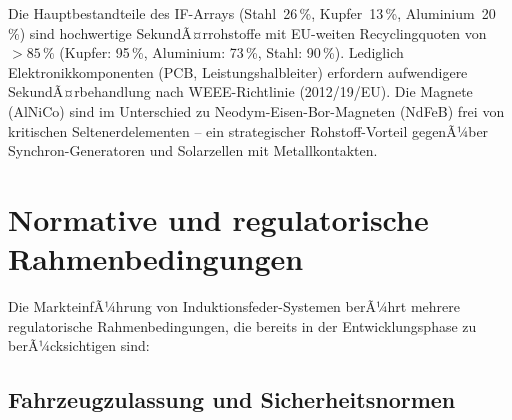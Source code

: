 ﻿\documentclass[12pt, a4paper]{report}
\theoremstyle{definition}
\theoremstyle{remark}
\begin{document}
Die Hauptbestandteile des IF-Arrays (Stahl~26\,\%, Kupfer~13\,\%,
Aluminium~20\,\%) sind hochwertige SekundÃ¤rrohstoffe mit EU-weiten
Recyclingquoten von $> 85\,\%$ (Kupfer: 95\,\%, Aluminium: 73\,\%,
Stahl: 90\,\%). Lediglich Elektronikkomponenten (PCB, Leistungshalbleiter)
erfordern aufwendigere SekundÃ¤rbehandlung nach WEEE-Richtlinie (2012/19/EU).
Die Magnete (AlNiCo) sind im Unterschied zu Neodym-Eisen-Bor-Magneten
(NdFeB) frei von kritischen Seltenerdelementen -- ein strategischer
Rohstoff-Vorteil gegenÃ¼ber Synchron-Generatoren und Solarzellen mit
Metallkontakten.

\section{Normative und regulatorische Rahmenbedingungen}
\label{sec:normativ}

Die MarkteinfÃ¼hrung von Induktionsfeder-Systemen berÃ¼hrt mehrere
regulatorische Rahmenbedingungen, die bereits in der Entwicklungsphase
zu berÃ¼cksichtigen sind:

\subsection{Fahrzeugzulassung und Sicherheitsnormen}
\end{document}
